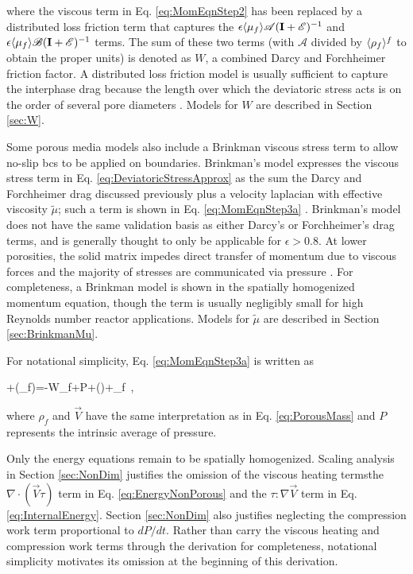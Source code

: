 \noindent where the viscous term in Eq. \eqref{eq:MomEqnStep2} has been replaced by a distributed loss friction term that captures the  \(\epsilon\langle\mu_f\rangle\mathscr{A}(\textbf{I}+\mathscr{E})^{-1}\) and \(\epsilon\langle\mu_f\rangle\mathscr{B}(\textbf{I}+\mathscr{E})^{-1}\) terms. The sum of these two terms (with \(\mathscr{A}\) divided by \(\langle\rho_f\rangle^f\) to obtain the proper units) is denoted as \(W\), a combined Darcy and Forchheimer friction factor. A distributed loss friction model is usually sufficient to capture the interphase drag because the length over which the deviatoric stress acts is on the order of several pore diameters \cite{kececioglu}. Models for \(W\) are described in Section \ref{sec:W}.

Some porous media models also include a Brinkman viscous stress term to allow no-slip \glspl{bc} to be applied on boundaries. Brinkman's model expresses the viscous stress term in Eq. \eqref{eq:DeviatoricStressApprox} as the sum the Darcy and Forchheimer drag discussed previously plus a velocity laplacian with effective viscosity \(\tilde{\mu}\); such a term is shown in Eq. \eqref{eq:MomEqnStep3a} \cite{nield,auwerda_2011,tecdoc1163}. Brinkman's model does not have the same validation basis as either Darcy's or Forchheimer's drag terms, and is generally thought to only be applicable for \(\epsilon>0.8\). At lower porosities, the solid matrix impedes direct transfer of momentum due to viscous forces and the majority of stresses are communicated via pressure \cite{nield}. For completeness, a Brinkman model is shown in the spatially homogenized momentum equation, though the term is usually negligibly small for high Reynolds number reactor applications. Models for \(\tilde{\mu}\) are described in Section \ref{sec:BrinkmanMu}.

For notational simplicity, Eq. \eqref{eq:MomEqnStep3a} is written as

\beq
\label{eq:MomEqnStep3}
+\nabla\cdot(\epsilon\rho_f)=-W\rho_f+\epsilon\nabla P+\nabla\cdot(\tilde{\mu}\nabla{})+\epsilon\rho_f\ ,
\eeq

\noindent where \(\rho_f\) and \(\vec{V}\) have the same interpretation as in Eq. \eqref{eq:PorousMass} and \(P\) represents the intrinsic average of pressure.

Only the energy equations remain to be spatially homogenized. Scaling analysis in Section \ref{sec:NonDim} justifies the omission of the viscous heating terms\mdash the \(\nabla\cdot(\vec{V}\tau)\) term in Eq. \eqref{eq:EnergyNonPorous} and the \(\tau\colon\nabla\vec{V}\) term in Eq. \eqref{eq:InternalEnergy}. Section \ref{sec:NonDim} also justifies neglecting the compression work term proportional to \(dP/dt\). Rather than carry the viscous heating and compression work terms through the derivation for completeness, notational simplicity motivates its omission at the beginning of this derivation. 

